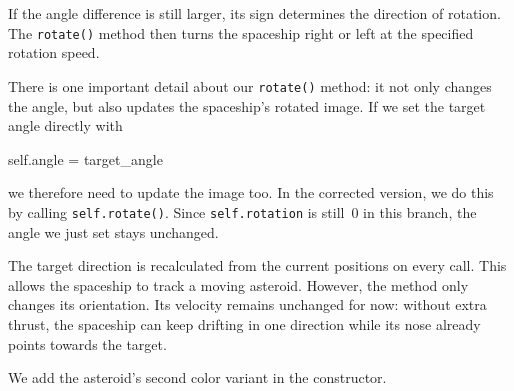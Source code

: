 If the angle difference is still larger, its sign determines the direction of rotation. The \texttt{rotate()} method then turns the spaceship right or left at the specified rotation speed.

There is one important detail about our \texttt{rotate()} method: it not only changes the angle, but also updates the spaceship's rotated image. If we set the target angle directly with
\begin{codebox}
	self.angle = target_angle
\end{codebox}
we therefore need to update the image too. In the corrected version, we do this by calling \texttt{self.rotate()}. Since \texttt{self.rotation} is still~0 in this branch, the angle we just set stays unchanged.

The target direction is recalculated from the current positions on every call. This allows the spaceship to track a moving asteroid. However, the method only changes its orientation. Its velocity remains unchanged for now: without extra thrust, the spaceship can keep drifting in one direction while its nose already points towards the target.


We add the asteroid's second color variant in the constructor.


